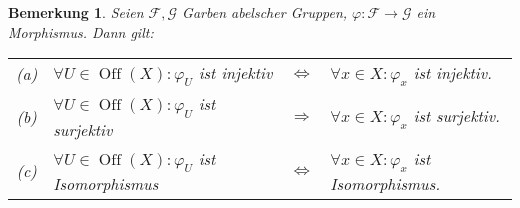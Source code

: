 \documentclass[a4paper,oneside]{scrbook}
\theoremstyle{break}
\newtheorem{Bem}[Def]{Bemerkung}
\theoremstyle{nonumberbreak}
\theoremstyle{nonumberplain}
\theoremstyle{break}
\newcommand{\Off}{%
	\ensuremath{\operatorname{Off}}%
}
\renewcommand{\phi}{%
	\ensuremath{\varphi}%
}
\begin{document}
\begin{Bem}\label{bem:sheaf_morphism:epi_mono_iso_stalk_morphism}
	Seien $\mathcal{F}, \mathcal{G}$ Garben abelscher Gruppen, $\phi\colon \mathcal{F} \to \mathcal{G}$ ein Morphismus. Dann gilt:\\
	{%
	\centering
		\begin{tabular}{clcl}
		(a)	& $\forall U \in \Off(X)\colon\phi_U$ ist injektiv		& $\Longleftrightarrow$ & $\forall x \in X\colon \phi_x$ ist injektiv.\\
		(b) & $\forall U \in \Off(X)\colon\phi_U$ ist surjektiv		& $\Longrightarrow$		& $\forall x \in X\colon \phi_x$ ist surjektiv.\\
		(c) & $\forall U \in \Off(X)\colon\phi_U$ ist Isomorphismus	& $\Longleftrightarrow$	& $\forall x \in X\colon \phi_x$ ist Isomorphismus.
		\end{tabular}
	}
\end{Bem}
\end{document}
